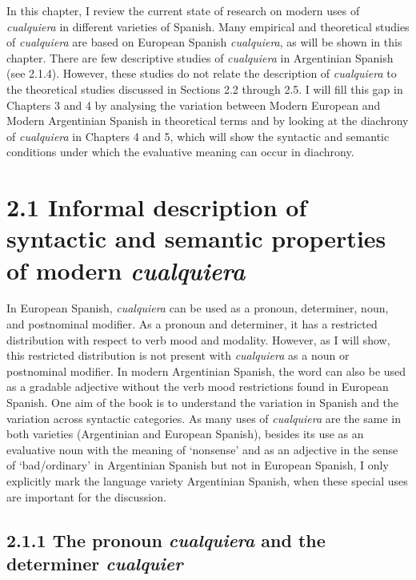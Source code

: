 In this chapter, I review the current state of research on modern uses of \textit{cualquiera} in different varieties of Spanish. Many empirical and theoretical studies of \textit{cualquiera} are based on European Spanish \textit{cualquiera}, as will be shown in this chapter. There are few descriptive studies of \textit{cualquiera} in Argentinian Spanish (see 2.1.4). However, these studies do not relate the description of \textit{cualquiera} to the theoretical studies discussed in Sections 2.2 through 2.5. I will fill this gap in Chapters 3 and 4 by analysing the variation between Modern European and Modern Argentinian Spanish in theoretical terms and by looking at the diachrony of \textit{cualquiera} in Chapters 4 and 5, which will show the syntactic and semantic conditions under which the evaluative meaning can occur in diachrony. 

\section{\textbf{2.1} \textbf{Informal} \textbf{description} \textbf{of} \textbf{syntactic} \textbf{and} \textbf{semantic} \textbf{properties} \textbf{of} \textbf{modern} \textbf{\textit{cualquiera}}}

In European Spanish, \textit{cualquiera} can be used as a pronoun, determiner, noun, and postnominal modifier. As a pronoun and determiner, it has a restricted distribution with respect to verb mood and modality. However, as I will show, this restricted distribution is not present with \textit{cualquiera} as a noun or postnominal modifier. In modern Argentinian Spanish, the word can also be used as a gradable adjective without the verb mood restrictions found in European Spanish. One aim of the book is to understand the variation in Spanish and the variation across syntactic categories. As many uses of \textit{cualquiera} are the same in both varieties (Argentinian and European Spanish), besides its use as an evaluative noun with the meaning of ‘nonsense’ and as an adjective in the sense of ‘bad/ordinary’ in Argentinian Spanish but not in European Spanish, I only explicitly mark the language variety Argentinian Spanish, when these special uses are important for the discussion.

\subsection{\textbf{2.1.1} \textbf{The} \textbf{pronoun} \textbf{\textit{cualquiera} }\textbf{and} \textbf{the} \textbf{determiner} \textbf{\textit{cualquier}}}

